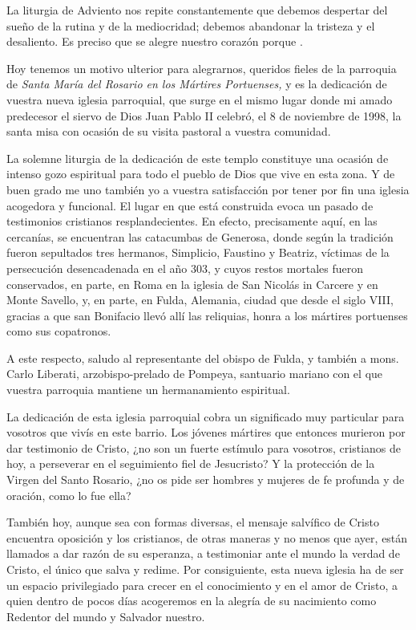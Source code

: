 La liturgia de Adviento nos repite constantemente que debemos despertar del sueño de la rutina y de la mediocridad; debemos abandonar la tristeza y el desaliento. Es preciso que se alegre nuestro corazón porque .

Hoy tenemos un motivo ulterior para alegrarnos, queridos fieles de la parroquia de \emph{Santa María del Rosario en los Mártires Portuenses,} y es la dedicación de vuestra nueva iglesia parroquial, que surge en el mismo lugar donde mi amado predecesor el siervo de Dios Juan Pablo II celebró, el 8 de noviembre de 1998, la santa misa con ocasión de su visita pastoral a vuestra comunidad.

La solemne liturgia de la dedicación de este templo constituye una ocasión de intenso gozo espiritual para todo el pueblo de Dios que vive en esta zona. Y de buen grado me uno también yo a vuestra satisfacción por tener por fin una iglesia acogedora y funcional. El lugar en que está construida evoca un pasado de testimonios cristianos resplandecientes. En efecto, precisamente aquí, en las cercanías, se encuentran las catacumbas de Generosa, donde según la tradición fueron sepultados tres hermanos, Simplicio, Faustino y Beatriz, víctimas de la persecución desencadenada en el año 303, y cuyos restos mortales fueron conservados, en parte, en Roma en la iglesia de San Nicolás in Carcere y en Monte Savello, y, en parte, en Fulda, Alemania, ciudad que desde el siglo VIII, gracias a que san Bonifacio llevó allí las reliquias, honra a los mártires portuenses como sus copatronos.

A este respecto, saludo al representante del obispo de Fulda, y también a mons. Carlo Liberati, arzobispo-prelado de Pompeya, santuario mariano con el que vuestra parroquia mantiene un hermanamiento espiritual.

La dedicación de esta iglesia parroquial cobra un significado muy particular para vosotros que vivís en este barrio. Los jóvenes mártires que entonces murieron por dar testimonio de Cristo, ¿no son un fuerte estímulo para vosotros, cristianos de hoy, a perseverar en el seguimiento fiel de Jesucristo? Y la protección de la Virgen del Santo Rosario, ¿no os pide ser hombres y mujeres de fe profunda y de oración, como lo fue ella?

También hoy, aunque sea con formas diversas, el mensaje salvífico de Cristo encuentra oposición y los cristianos, de otras maneras y no menos que ayer, están llamados a dar razón de su esperanza, a testimoniar ante el mundo la verdad de Cristo, el único que salva y redime. Por consiguiente, esta nueva iglesia ha de ser un espacio privilegiado para crecer en el conocimiento y en el amor de Cristo, a quien dentro de pocos días acogeremos en la alegría de su nacimiento como Redentor del mundo y Salvador nuestro.

